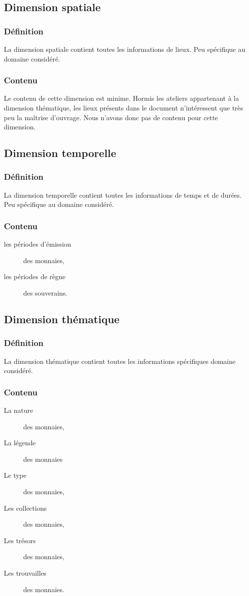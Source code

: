 \documentclass[a4paper, 11pt]{report}
\begin{document}
    \subsection{Dimension spatiale}
    \subsubsection{Définition}
     La dimension spatiale contient toutes les informations de lieux. Peu spécifique au domaine considéré.
    \subsubsection{Contenu}
       Le contenu de cette dimension est minime. Hormis les ateliers appartenant à la dimension thématique, les lieux présents dans le document n'intéressent que très peu la maîtrise d'ouvrage. Nous n'avons donc pas de contenu pour cette dimension.
	\subsection{Dimension temporelle}
	    \subsubsection{Définition}
    La dimension temporelle contient toutes les informations de temps et de durées. Peu spécifique au domaine considéré.\\
    \subsubsection{Contenu}
    \begin{description}
    \item[les périodes d'émission] des monnaies,
    \item[les périodes de règne] des souverains.
    \end{description}
    
	\subsection{Dimension thématique}
	    \subsubsection{Définition}
    La dimension thématique contient toutes les informations spécifiques domaine considéré. 
    \subsubsection{Contenu}	
    \begin{description}
    \item[La nature] des monnaies,
    \item[La légende] des monnaies
    \item[Le type] des monnaies,
    \item[Les collections] des monnaies,
    \item[Les trésors] des monnaies,
    \item[Les trouvailles] des monnaies.
    \end{description}
    
\end{document}
